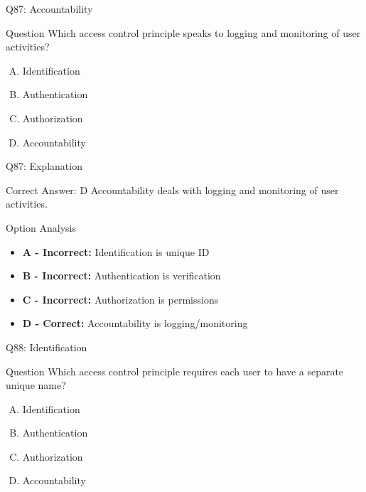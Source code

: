 \documentclass{beamer}
\begin{document}
	\begin{frame}{Q87: Accountability}
		\begin{block}{Question}
			Which access control principle speaks to logging and monitoring of user activities?
		\end{block}
		\begin{enumerate}[(A)]
			\item Identification
			\item Authentication
			\item Authorization
			\item Accountability
		\end{enumerate}
	\end{frame}
	
	\begin{frame}{Q87: Explanation}
		\begin{block}{Correct Answer: D}
			Accountability deals with logging and monitoring of user activities.
		\end{block}
		\begin{block}{Option Analysis}
			\begin{itemize}
				\item \textbf{A - Incorrect:} Identification is unique ID
				\item \textbf{B - Incorrect:} Authentication is verification
				\item \textbf{C - Incorrect:} Authorization is permissions
				\item \textbf{D - Correct:} Accountability is logging/monitoring
			\end{itemize}
		\end{block}
	\end{frame}
	
	\begin{frame}{Q88: Identification}
		\begin{block}{Question}
			Which access control principle requires each user to have a separate unique name?
		\end{block}
		\begin{enumerate}[(A)]
			\item Identification
			\item Authentication
			\item Authorization
			\item Accountability
		\end{enumerate}
	\end{frame}
	
\end{document}
